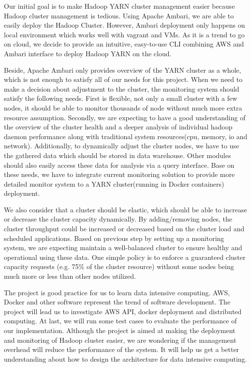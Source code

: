 \documentclass{article}
\begin{document}
Our initial goal is to make Hadoop YARN cluster management easier because Hadoop cluster management is tedious. Using Apache Ambari, we are able to easily deploy the Hadoop Cluster. However, Ambari deployment only happens on local environment which works well with vagrant and VMs. As it is a trend to go on cloud, we decide to provide an intuitive, easy-to-use CLI combining AWS and Ambari interface to deploy Hadoop YARN on the cloud.

Beside, Apache Ambari only provides overview of the YARN cluster as a whole, which is not enough to satisfy all of our needs for this project. When we need to make a decision about adjustment to the cluster, the monitoring system should satisfy the following needs. First is flexible, not only a small cluster with a few nodes, it should be able to monitor thousands of node without much more extra resource assumption. Secondly, we are expecting to have a good understanding of the overview of the cluster  health and a deeper analysis of individual hadoop daemon performance along with traditional system resources(cpu, memory, io and network).  Additionally, to dynamically adjust the cluster nodes, we have to use the gathered data which should be stored in data warehouse.  Other modules should also easily access these data for analysis via a query interface. Base on these needs, we have to integrate current monitoring solution to provide more detailed monitor system to a YARN cluster(running in Docker containers) deployment.

We also consider that a cluster should be elastic, which should be able to increase or decrease  the cluster capacity dynamically. By adding/removing nodes, the cluster throughput could be increased or decreased based on the cluster load and scheduled applications. Based on previous step by setting up a monitoring system, we are expecting maintain a well-balanced cluster to ensure healthy and operational using these data. One simple policy is to enforce a guaranteed cluster capacity requests (e.g. 75\% of the cluster resource) without some nodes being much more or less than other nodes utilized.

The project is good practice for us to learn data intensive computing. AWS, Docker and other software represent the trend of software development. The project will lead us to investigate AWS API, docker deployment and distributed computing. At last, we will run some test cases to evaluate the performance of our implementation. Although the project is aimed at making the deployment and monitoring of Hadoop cluster easier, we are wondering if the management overhead will reduce the performance of the system. It will help us  get a better understanding about how to design the architecture for data intensive computing.
\end{document}
